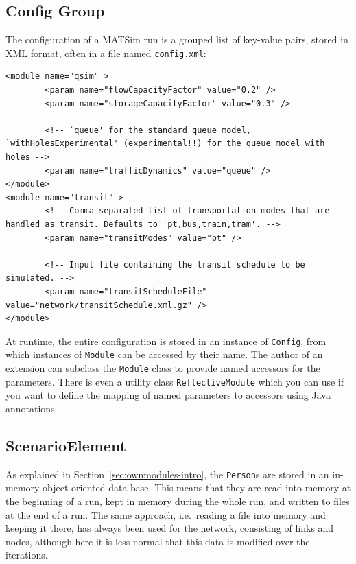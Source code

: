 \subsection{Config Group}
\label{sec:config}
The configuration of a MATSim run is a grouped list of key-value pairs, stored in XML
format, often in a file named \verb$config.xml$:
\begin{lstlisting}
<module name="qsim" >
		<param name="flowCapacityFactor" value="0.2" />
		<param name="storageCapacityFactor" value="0.3" />

		<!-- `queue' for the standard queue model, `withHolesExperimental' (experimental!!) for the queue model with holes -->
		<param name="trafficDynamics" value="queue" />
</module>
<module name="transit" >
		<!-- Comma-separated list of transportation modes that are handled as transit. Defaults to 'pt,bus,train,tram'. -->
		<param name="transitModes" value="pt" />

		<!-- Input file containing the transit schedule to be simulated. -->
		<param name="transitScheduleFile" value="network/transitSchedule.xml.gz" />
</module>
\end{lstlisting}
At runtime, the entire configuration is stored in an instance of \verb$Config$, from which instances of \verb$Module$ can be accessed by their name.
The author of an extension can subclass the \verb$Module$ class to provide named accessors for the parameters.
There is even a utility class \verb$ReflectiveModule$ which you can use if you want to define the mapping of named parameters to accessors
using Java annotations.

\subsection{ScenarioElement}

As explained in Section~\ref{sec:ownmodules-intro}, the \verb$Person$s are stored in an in-memory object-oriented data base.  This means that they are read into memory at the beginning of a run, kept in memory during the whole run, and written to files at the end of a run.
%
The same approach, i.e.\ reading a file into memory and keeping it there, has always been used for the network, consisting of links and nodes, although here it is less normal that this data is modified over the iterations.

